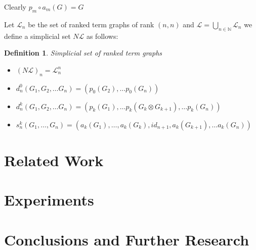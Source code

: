 \documentclass[12pt]{article}
\newtheorem{definition}{Definition}
\newcommand{\N}{\mathbb{N}}
\newcommand{\1}{\mathbbm{1}}
\renewcommand{\L}{\mathcal{L}}
\begin{document}
Clearly $p_m\circ a_m (G) = G$
\newpage

Let $\L_n$ be the set of ranked term graphs of rank $(n,n)$ and $\L = \bigcup_{n\in\N} \L_n$ we define a simplicial set $N\L$ as follows:
\begin{definition} Simplicial set of ranked term graphs
    \begin{itemize}
        \item $(N\L)_n = \L_n^n$
        \item $d_n^0(G_1, G_2, \dots G_n) = (p_0(G_2), \dots p_0(G_n))$
        \item $d_n^k(G_1, G_2, \dots G_n) = (p_k(G_1), \dots p_k(G_k \otimes G_{k+1}), \dots p_k(G_n))$
        \item $s_n^k(G_1, \dots, G_n) = (a_k(G_1), \dots, a_k(G_k), id_{n+1}, a_k(G_{k+1}), \dots a_k(G_n))$
    \end{itemize}
\end{definition}

\newpage
\section{Related Work}\label{relatedwork}

\section{Experiments}\label{experiments}

\section{Conclusions and Further Research}\label{conclusions}





\end{document}
